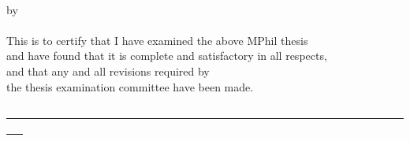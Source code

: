 \begin{center}
{\Large \thesistitle}\\
\vspace{5mm}
by\\
\vspace{3mm}
\thesisauthor\\
\vspace{5mm}
This is to certify that I have examined the above MPhil thesis\\
and have found that it is complete and satisfactory in all respects,\\
and that any and all revisions required by\\
the thesis examination committee have been made.
\end{center}

\vspace{15mm}

\begin{center}
\underline{~~~~~~~~~~~~~~~~~~~~~~~~~~~~~~~~~~~~~~~~~~~~~~~~~~~~~~~~~~~~~~~~~~~~~~~~~~~ }\\
\supervisorinfo
\end{center}



\vspace{5mm}
\begin{center}
\departmentname\\
\vspace{5mm}
\signdate
\end{center}
